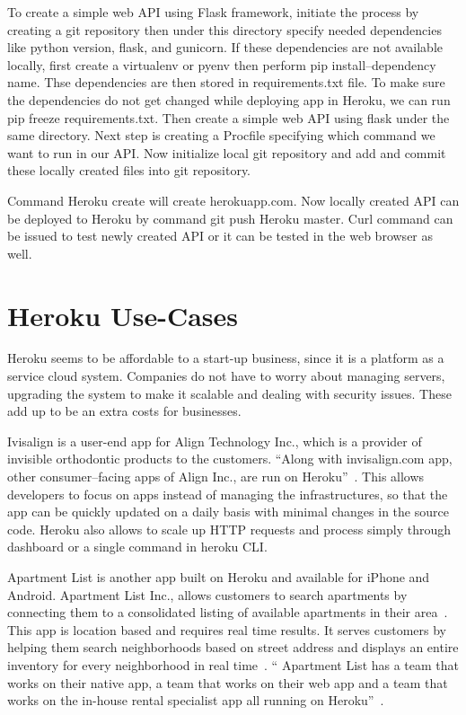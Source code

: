  To create a simple web API using Flask framework, initiate the process
 by creating a git repository then under this directory specify needed
 dependencies like python version, flask, and gunicorn. If these
 dependencies are not available locally, first create a virtualenv or
 pyenv then perform pip install--dependency name. Thse dependencies are
 then stored in requirements.txt file. To make sure the dependencies do
 not get changed while deploying app in Heroku, we can run pip freeze
 requirements.txt. Then create a simple web API using flask under the same
 directory. Next step is creating a Procfile specifying which command we
 want to run in our API. Now initialize local git repository and  add and
 commit these locally created files into git repository.

 Command Heroku create will create herokuapp.com. Now locally created API
 can be deployed to Heroku by command git push Heroku master. Curl command
 can be issued to test newly created API or it can be tested in the web
 browser as well.


\section{Heroku Use-Cases}
 Heroku seems to be affordable to a start-up business, since it is a platform
 as a service cloud system. Companies do not have to worry about managing
 servers, upgrading the system to make it scalable and dealing with security
 issues. These add up to be an extra costs for businesses. 

 Ivisalign is a user-end app for Align Technology Inc., which is a provider of
 invisible orthodontic products to the customers. ``Along with invisalign.com app,
 other consumer--facing apps of Align Inc., are run on
 Heroku''~\cite{hid-sp18-415-www-customers-heroku-com}. This allows developers to focus
 on apps instead of managing the infrastructures, so that the app can be quickly
 updated on a daily basis with minimal changes in the source code. Heroku also
 allows to scale up HTTP requests and process simply through dashboard or a
 single command in heroku CLI. 

 Apartment List is another app built on Heroku and available for iPhone and
 Android. Apartment List Inc., allows customers to search apartments by
 connecting them to a consolidated listing of available apartments in
 their area~\cite{hid-sp18-415-www-customers-heroku-com}. This app is location based
 and requires real time results. It serves customers by helping them search
 neighborhoods based on street address and displays an entire inventory for
 every neighborhood in real time~\cite{hid-sp18-415-www-customers-heroku-com}.
 `` Apartment List has a team that works on their native app, a team
 that works on their web app and a team that works on the in-house rental
 specialist app  all running on Heroku''~\cite{www-customers-heroku-com}.

